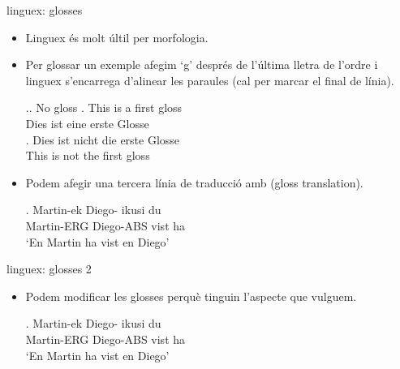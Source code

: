 \begin{frame}[fragile]{linguex: glosses}
\begin{itemize}
\item Linguex és molt últil per morfologia.
\item Per glossar un exemple afegim `g' després de l'última lletra de l'ordre i linguex s'encarrega d'alinear les paraules (cal \keystrokebftt{\bs\bs}  per marcar el final de línia).
\begin{exampletwouptiny2}
\ex.\a. No gloss
\bg. This is a first gloss\\
Dies ist eine erste Glosse\\

\exg.
Dies ist nicht die erste Glosse\\
This is not the first gloss\\

\end{exampletwouptiny2}
\item Podem afegir una tercera línia de traducció amb  (gloss translation).
\begin{exampletwouptiny2}
\exg.
Martin-ek Diego-\zero{} ikusi du \\
Martin-ERG Diego-ABS vist ha \\
\glt `En Martin ha vist en Diego'

\end{exampletwouptiny2}
\end{itemize}

\end{frame}

\begin{frame}[fragile]{linguex: glosses 2}
\begin{itemize}
\item Podem modificar les glosses perquè tinguin l'aspecte que vulguem.
\begin{exampletwouptiny}
\renewcommand{\eachwordone}{\itshape}
\renewcommand{\eachwordtwo}{\tiny}

\exg.
Martin-ek Diego-\zero{} ikusi du \\
Martin-ERG Diego-ABS vist ha \\
\glt `En Martin ha vist en Diego'


\end{exampletwouptiny}
\end{itemize}

\end{frame}

